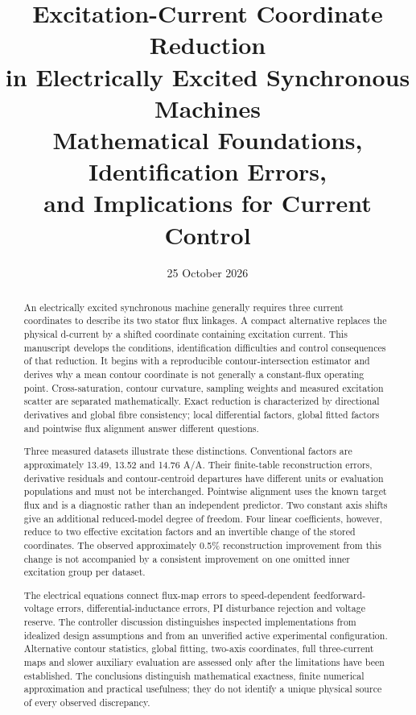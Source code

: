 \documentclass[11pt,a4paper,oneside]{report}
\title{Excitation-Current Coordinate Reduction\\in Electrically Excited Synchronous Machines\\[8pt]
\large Mathematical Foundations, Identification Errors,\\and Implications for Current Control}
\author{}
\date{25 October 2026}
\numberwithin{equation}{chapter}
\begin{document}
\hypersetup{pageanchor=false}
\maketitle
\begin{abstract}
An electrically excited synchronous machine generally requires three current coordinates to describe its two stator flux linkages. A compact alternative replaces the physical d-current by a shifted coordinate containing excitation current. This manuscript develops the conditions, identification difficulties and control consequences of that reduction. It begins with a reproducible contour-intersection estimator and derives why a mean contour coordinate is not generally a constant-flux operating point. Cross-saturation, contour curvature, sampling weights and measured excitation scatter are separated mathematically. Exact reduction is characterized by directional derivatives and global fibre consistency; local differential factors, global fitted factors and pointwise flux alignment answer different questions.

Three measured datasets illustrate these distinctions. Conventional factors are approximately 13.49, 13.52 and 14.76 A/A. Their finite-table reconstruction errors, derivative residuals and contour-centroid departures have different units or evaluation populations and must not be interchanged. Pointwise alignment uses the known target flux and is a diagnostic rather than an independent predictor. Two constant axis shifts give an additional reduced-model degree of freedom. Four linear coefficients, however, reduce to two effective excitation factors and an invertible change of the stored coordinates. The observed approximately 0.5\% reconstruction improvement from this change is not accompanied by a consistent improvement on one omitted inner excitation group per dataset.

The electrical equations connect flux-map errors to speed-dependent feedforward-voltage errors, differential-inductance errors, PI disturbance rejection and voltage reserve. The controller discussion distinguishes inspected implementations from idealized design assumptions and from an unverified active experimental configuration. Alternative contour statistics, global fitting, two-axis coordinates, full three-current maps and slower auxiliary evaluation are assessed only after the limitations have been established. The conclusions distinguish mathematical exactness, finite numerical approximation and practical usefulness; they do not identify a unique physical source of every observed discrepancy.
\end{abstract}
\clearpage
{}
\hypersetup{pageanchor=true}
\tableofcontents
\clearpage
{}








\end{document}
